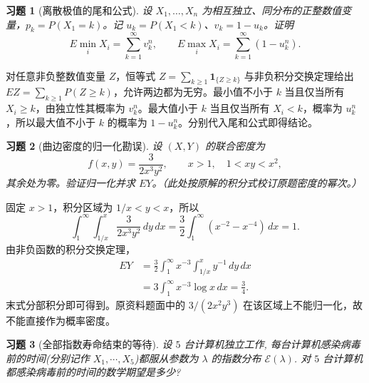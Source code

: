 \documentclass[12pt,fontset=fandol]{ctexart}
\newtheorem{exercise}{习题}[section]
\begin{document}
\begin{exercise}[离散极值的尾和公式]\label{q:A5.12}
设 $X_1,\ldots,X_n$ 为相互独立、同分布的正整数值变量，$p_k=P(X_1=k)$。记 $u_k=P(X_1<k)$、$v_k=1-u_k$。证明\[E\min_iX_i=\sum_{k=1}^\infty v_k^n,\qquad E\max_iX_i=\sum_{k=1}^\infty(1-u_k^n).\]\par{}
\end{exercise}

\begin{solve}\label{a:A5.12}对任意非负整数值变量 $Z$，恒等式 $Z=\sum_{k\ge1}\mathbf1_{\{Z\ge k\}}$ 与非负积分交换定理给出 $EZ=\sum_{k\ge1}P(Z\ge k)$，允许两边都为无穷。最小值不小于 $k$ 当且仅当所有 $X_i\ge k$，由独立性其概率为 $v_k^n$。最大值小于 $k$ 当且仅当所有 $X_i<k$，概率为 $u_k^n$，所以最大值不小于 $k$ 的概率为 $1-u_k^n$。分别代入尾和公式即得结论。\end{solve}

\begin{exercise}[曲边密度的归一化勘误]\label{q:A5.14}
设 $(X,Y)$ 的联合密度为\[f(x,y)=\frac{3}{2x^3y^2},\qquad x>1,\quad 1<xy<x^2,\]其余处为零。验证归一化并求 $EY$。（此处按原解的积分式校订原题密度的幂次。）\par{}
\end{exercise}

\begin{solve}\label{a:A5.14}固定 $x>1$，积分区域为 $1/x<y<x$，所以\[\int_1^\infty\!\int_{1/x}^{x}\frac{3}{2x^3y^2}\,dy\,dx=\frac32\int_1^\infty(x^{-2}-x^{-4})\,dx=1.\]由非负函数的积分交换定理，\[\begin{aligned}EY&=\frac32\int_1^\infty x^{-3}\!\int_{1/x}^x y^{-1}\,dy\,dx\\&=3\int_1^\infty x^{-3}\log x\,dx=\frac34.\end{aligned}\]末式分部积分即可得到。原资料题面中的 $3/(2x^2y^3)$ 在该区域上不能归一化，故不能直接作为概率密度。\end{solve}

\begin{exercise}[全部指数寿命结束的等待]\label{q:A5.17}
设 $5$ 台计算机独立工作, 每台计算机感染病毒前的时间(分别记作 $X_1,\cdots,X_5$)都服从参数为 $\lambda$ 的指数分布 $\mathcal{E}(\lambda)$. 对 $5$ 台计算机都感染病毒前的时间的数学期望是多少?\par{}
\end{exercise}
\end{document}
